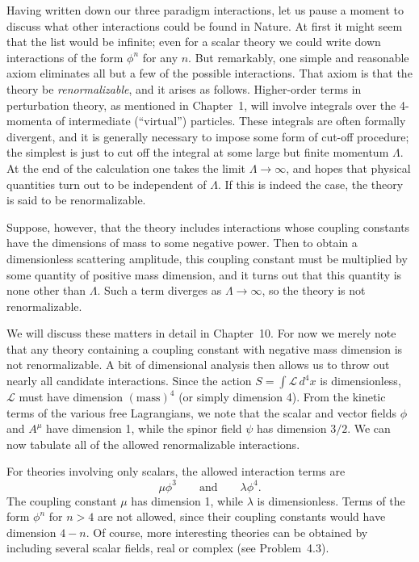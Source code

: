 Having written down our three paradigm interactions, let us pause a moment
to discuss what other interactions could be found in Nature.  At first it
might seem that the list would be infinite; even for a scalar theory we could
write down interactions of the form $\phi^n$ for any $n$.  But remarkably,
one simple and reasonable axiom eliminates all but a few of the possible
interactions.  That axiom is that the theory be \emph{renormalizable}, and it
arises as follows.  Higher-order terms in perturbation theory, as mentioned
in Chapter~1, will involve integrals over the 4-momenta of intermediate
(``virtual'') particles.  These integrals are often formally divergent, and it
is generally necessary to impose some form of cut-off procedure; the simplest
is just to cut off the integral at some large but finite momentum $\Lambda$.
At the end of the calculation one takes the limit $\Lambda\to\infty$, and
hopes that physical quantities turn out to be independent of $\Lambda$.  If
this is indeed the case, the theory is said to be renormalizable.

Suppose, however, that the theory includes interactions whose coupling
constants have the dimensions of mass to some negative power.  Then to obtain
a dimensionless scattering amplitude, this coupling constant must be
multiplied by some quantity of positive mass dimension, and it turns out that
this quantity is none other than $\Lambda$.  Such a term diverges as
$\Lambda\to\infty$, so the theory is not renormalizable.

We will discuss these matters in detail in Chapter~10.  For now we merely
note that any theory containing a coupling constant with negative mass
dimension is not renormalizable.  A bit of dimensional analysis then allows
us to throw out nearly all candidate interactions.  Since the action
$S = \int\mathcal{L}\,d^4x$ is dimensionless, $\mathcal{L}$ must have
dimension $(\mathrm{mass})^4$ (or simply dimension 4).  From the kinetic terms
of the various free Lagrangians, we note that the scalar and vector fields
$\phi$ and $A^\mu$ have dimension 1, while the spinor field $\psi$ has
dimension $3/2$.  We can now tabulate all of the allowed renormalizable
interactions.

For theories involving only scalars, the allowed interaction terms are
\begin{equation}
  \mu\phi^3 \qquad\text{and}\qquad \lambda\phi^4 .
\end{equation}
The coupling constant $\mu$ has dimension 1, while $\lambda$ is
dimensionless.  Terms of the form $\phi^n$ for $n>4$ are not allowed, since
their coupling constants would have dimension $4-n$.  Of course, more
interesting theories can be obtained by including several scalar fields, real
or complex (see Problem~4.3).

